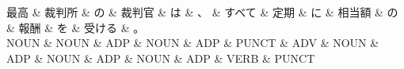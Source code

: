 \documentclass[tikz,border=5pt]{standalone}
\begin{document}
\normalsize
\begin{dependency}[edge unit distance=12.0pt]
    \begin{deptext}[column sep=1em]
        最高 \& 裁判所 \& の \& 裁判官 \& は \& 、 \& すべて \& 定期 \& に \& 相当額 \& の \& 報酬 \& を \& 受ける \& 。\\
        NOUN \& NOUN \& ADP \& NOUN \& ADP \& PUNCT \& ADV \& NOUN \& ADP \& NOUN \& ADP \& NOUN \& ADP \& VERB \& PUNCT\\
    \end{deptext}
\end{dependency}
\end{document}
